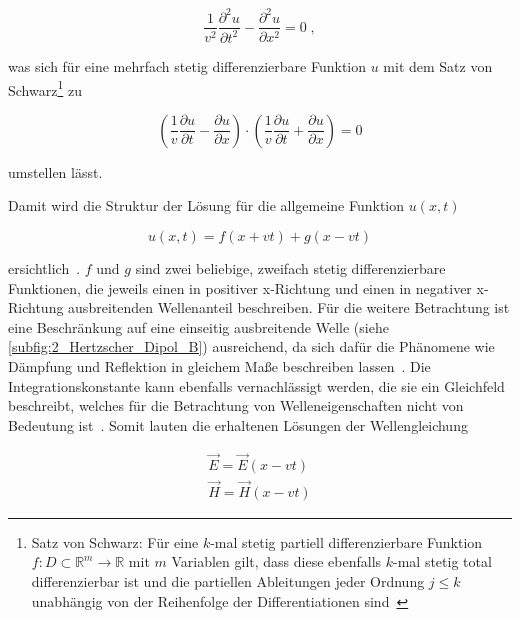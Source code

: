 \begin{equation}
    \frac{1}{v^2}\frac{\partial^2 u}{\partial t^2} - \frac{\partial^2 u}{\partial x^2} = 0 \; ,
\end{equation}

was sich für eine mehrfach stetig differenzierbare Funktion $u$ mit dem Satz von Schwarz\footnote{Satz von Schwarz: Für eine $k$-mal stetig partiell differenzierbare Funktion $f : D \subset \mathbb{R}^m \to \mathbb{R}$ mit $m$ Variablen gilt, dass diese ebenfalls $k$-mal stetig total differenzierbar ist und die partiellen Ableitungen jeder Ordnung $j \leq k$ unabhängig von der Reihenfolge der Differentiationen sind~\cite{Vorlesung_Ingenieursmathematik}} zu

\begin{equation}
    \left(\frac{1}{v} \frac{\partial u}{\partial t} - \frac{\partial u}{\partial x}\right) \cdot \left(\frac{1}{v} \frac{\partial u}{\partial t} + \frac{\partial u}{\partial x}\right) = 0
\end{equation}

umstellen lässt. \par
Damit wird die Struktur der Lösung für die allgemeine Funktion $u(x,t)$ 

\begin{equation}
    u(x,t) = f(x+vt) + g(x-vt)
\end{equation}

ersichtlich~\cite{Methoden_physikalischer_Mathematik_Band_2}. $f$ und $g$ sind zwei beliebige, zweifach stetig differenzierbare Funktionen, die jeweils einen in positiver x-Richtung und einen in negativer x-Richtung ausbreitenden Wellenanteil beschreiben. Für die weitere Betrachtung ist eine Beschränkung auf eine einseitig ausbreitende Welle (siehe \Abb \ref{subfig:2_Hertzscher_Dipol_B}) ausreichend, da sich dafür die Phänomene wie Dämpfung und Reflektion in gleichem Maße beschreiben lassen~\cite{EM_Schirmung}. Die Integrationskonstante kann ebenfalls vernachlässigt werden, die sie ein Gleichfeld beschreibt, welches für die Betrachtung von Welleneigenschaften nicht von Bedeutung ist~\cite{EM_Schirmung}. Somit lauten die erhaltenen Lösungen der Wellengleichung

\begin{subequations}
    \begin{align}
        \vec E = \vec E(x-vt) \\
        \vec H = \vec H(x-vt)
    \end{align}
\end{subequations}

